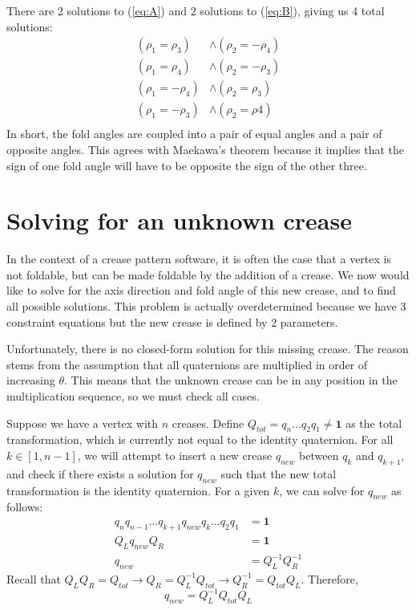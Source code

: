 \documentclass[11pt]{article}
\begin{document}
There are 2 solutions to (\ref{eq:A}) and 2 solutions to (\ref{eq:B}), giving us 4 total solutions: 
\begin{align}
(\rho_1=\rho_3) &\land (\rho_2=-\rho_4)\\
(\rho_1=\rho_4) &\land (\rho_2=-\rho_3)\\
(\rho_1=-\rho_4) &\land (\rho_2=\rho_3)\\
(\rho_1=-\rho_3 )&\land (\rho_2=\rho4)\\
\end{align}
In short, the fold angles are coupled into a pair of equal angles and a pair of opposite angles. This agrees with Maekawa's theorem because it implies that the sign of one fold angle will have to be opposite the sign of the other three.


\section{Solving for an unknown crease}
In the context of a crease pattern software, it is often the case that a vertex is not foldable, but can be made foldable by the addition of a crease. We now would like to solve for the axis direction and fold angle of this new crease, and to find all possible solutions. This problem is actually overdetermined because we have 3 constraint equations but the new crease is defined by 2 parameters.

Unfortunately, there is no closed-form solution for this missing crease. The reason stems from the assumption that all quaternions are multiplied in order of increasing $\theta$. This means that the unknown crease can be in any position in the multiplication sequence, so we must check all cases. 

Suppose we have a vertex with $n$ creases. Define $Q_{tot} = q_n \ldots q_2 q_1 \neq \mathbf{1}$ as the total transformation, which is currently not equal to the identity quaternion. For all $k \in [1, n-1]$, we will attempt to insert a new crease $q_{new}$ between $q_k$ and $q_{k+1}$, and check if there exists a solution for $q_{new}$ such that the new total transformation is the identity quaternion. For a given $k$, we can solve for $q_{new}$ as follows:
\begin{align}
    q_n q_{n-1}\ldots q_{k+1} q_{new} q_k \ldots q_2 q_1 &= \mathbf{1}\\
    Q_{L} q_{new} Q_{R} &= \mathbf{1}\\
    q_{new} &= Q_L^{-1} Q_R^{-1}
\end{align}
Recall that $Q_L Q_R = Q_{tot} \longrightarrow Q_R = Q_L^{-1} Q_{tot} \longrightarrow Q_R^{-1} = Q_{tot} Q_L$. Therefore,
\begin{equation}
    q_{new} = Q_L^{-1} Q_{tot} Q_L
\end{equation}
\end{document}
